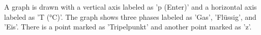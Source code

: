 A graph is drawn with a vertical axis labeled as 'p (Enter)' and a horizontal axis labeled as 'T (°C)'. The graph shows three phases labeled as 'Gas', 'Flüssig', and 'Eis'. There is a point marked as 'Tripelpunkt' and another point marked as 'z'.